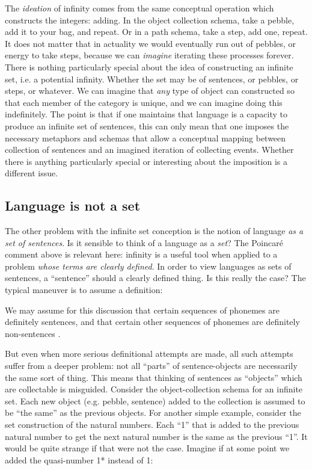   The \textit{ideation} of infinity comes from the same conceptual operation which constructs the integers: adding. In the object collection schema, take a pebble, add it to your bag, and repeat. Or in a path schema, take a step, add one, repeat. It does not matter that in actuality we would eventually run out of pebbles, or energy to take steps, because we can \textit{imagine} iterating these processes forever. There is nothing particularly special about the idea of constructing an infinite set, i.e. a potential infinity. Whether the set may be of sentences, or pebbles, or steps, or whatever. We can imagine that \textit{any} type of object can constructed so that each member of the category is unique, and we can imagine doing this indefinitely. The point is that if one maintains that language is a capacity to produce an infinite set of sentences, this can only mean that one imposes the necessary metaphors and schemas that allow a conceptual mapping between collection of sentences and an imagined iteration of collecting events. Whether there is anything particularly special or interesting about the imposition is a different issue.

\subsection{Language is not a set}

The other problem with the infinite set conception is the notion of language \textit{as a set of sentences}. Is it sensible to think of a language as a \textit{set}? The Poincaré comment above is relevant here: infinity is a useful tool when applied to a problem \textit{whose terms are clearly defined}. In order to view languages as sets of sentences, a “sentence” should a clearly defined thing. Is this really the case? The typical maneuver is to assume a definition:

We may assume for this discussion that certain sequences of phonemes are definitely sentences, and that certain other sequences of phonemes are definitely non-sentences \citep[14]{Chomsky1957}.

  But even when more serious definitional attempts are made, all such attempts suffer from a deeper problem: not all “parts” of sentence-objects are necessarily the same sort of thing. This means that thinking of sentences as “objects” which are collectable is misguided. Consider the object-collection schema for an infinite set. Each new object (e.g. pebble, sentence) added to the collection is assumed to be “the same” as the previous objects. For another simple example, consider the set construction of the natural numbers. Each “1” that is added to the previous natural number to get the next natural number is the same as the previous “1”. It would be quite strange if that were not the case. Imagine if at some point we added the quasi-number 1* instead of 1:

